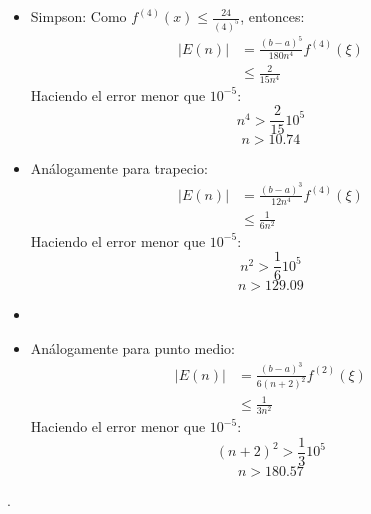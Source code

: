 \begin{frame}
    \begin{itemize}
        \item Simpson:
        Como $f^{(4)}(x)\leq\frac{24}{(4)^5}$, entonces:
        \begin{align*}
            |E(n)|&=\frac{(b-a)^5}{180n^4}f^{(4)}(\xi)\\
            &\leq \frac{2}{15n^4}
        \end{align*}
        Haciendo el error menor que $10^{-5}$:
        $$n^4>\frac{2}{15}10^5$$
        $$n>10.74$$
        \item Análogamente para trapecio:
        \begin{align*}
            |E(n)|&=\frac{(b-a)^3}{12n^4}f^{(4)}(\xi)\\
            &\leq \frac{1}{6n^2}
        \end{align*}
        Haciendo el error menor que $10^{-5}$:
        $$n^2>\frac{1}{6}10^5$$
        $$n>129.09$$
    \end{itemize}
\end{frame}
\begin{frame}{}
    \begin{itemize}
        \item \item Análogamente para punto medio:
        \begin{align*}
            |E(n)|&=\frac{(b-a)^3}{6(n+2)^2}f^{(2)}(\xi)\\
            &\leq \frac{1}{3n^2}
        \end{align*}
        Haciendo el error menor que $10^{-5}$:
        $$(n+2)^2>\frac{1}{3}10^5$$
        $$n>180.57$$
    \end{itemize}
\end{frame}

\begin{frame}
    \begin{solution}
        .
    \end{solution}
\end{frame}